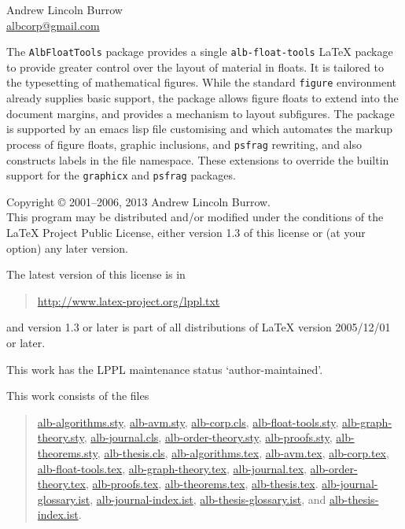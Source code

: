 \documentclass[11pt,a4paper,oneside,titlepage]{alb-corp}
\begin{document}


\begin{albTitlePage}


  Andrew Lincoln Burrow\\
  \url{albcorp@gmail.com}



  The \texttt{AlbFloatTools} package provides a single
  \texttt{alb-float-tools} \LaTeX{} package to provide greater control
  over the layout of material in floats.  It is tailored to the
  typesetting of mathematical figures.  While the standard
  \texttt{figure} environment already supplies basic support, the
  package allows figure floats to extend into the document margins, and
  provides a mechanism to layout subfigures.  The package is supported
  by an emacs lisp file customising \AUCTeX{} and \RefTeX{} which
  automates the markup process of figure floats, graphic inclusions, and
  \texttt{psfrag} rewriting, and also constructs labels in the file
  namespace.  These extensions to \AUCTeX{} override the builtin support
  for the \texttt{graphicx} and \texttt{psfrag} packages.



  Copyright \copyright{} 2001--2006, 2013 Andrew Lincoln Burrow.\\
  This program may be distributed and/or modified under the conditions
  of the \LaTeX{} Project Public License, either version 1.3 of this
  license or (at your option) any later version.

  \medskip{}

  The latest version of this license is in
  \begin{quote}
    \url{http://www.latex-project.org/lppl.txt}
  \end{quote}
  and version 1.3 or later is part of all distributions of LaTeX version
  2005/12/01 or later.

  \medskip{}

  This work has the LPPL maintenance status `author-maintained'.

  \medskip{}

  This work consists of the files
  \begin{quote}
    \begin{flushleft}
      \url{alb-algorithms.sty}, \url{alb-avm.sty}, \url{alb-corp.cls},
      \url{alb-float-tools.sty}, \url{alb-graph-theory.sty},
      \url{alb-journal.cls}, \url{alb-order-theory.sty},
      \url{alb-proofs.sty}, \url{alb-theorems.sty},
      \url{alb-thesis.cls}, \url{alb-algorithms.tex}, \url{alb-avm.tex},
      \url{alb-corp.tex}, \url{alb-float-tools.tex},
      \url{alb-graph-theory.tex}, \url{alb-journal.tex},
      \url{alb-order-theory.tex}, \url{alb-proofs.tex},
      \url{alb-theorems.tex}, \url{alb-thesis.tex}.
      \url{alb-journal-glossary.ist}, \url{alb-journal-index.ist},
      \url{alb-thesis-glossary.ist}, and \url{alb-thesis-index.ist}.
    \end{flushleft}
  \end{quote}



\end{albTitlePage}
\end{document}
